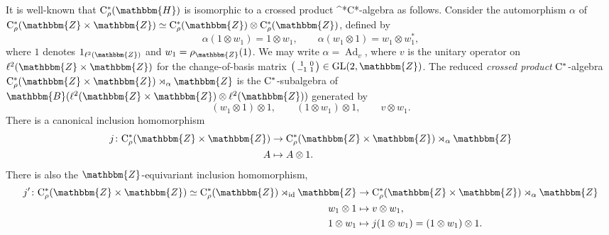 \documentclass{amsart}
\numberwithin{figure}{section}
\numberwithin{equation}{section}
\numberwithin{table}{section}
\theoremstyle{plain}
\theoremstyle{definition}
\theoremstyle{remark}
\theoremstyle{nonumber}
\newcommand{\Z}{\mathbb{Z}}
\newcommand{\Bdd}{\mathbb{B}}
\newcommand{\HH}{\mathbb{H}} %
\newcommand{\Cst}{\relax\ifmmode\mathrm{C}^*\else\textup{C*}\fi}
\newcommand{\Cstr}{\Cst_\rho} %
\newcommand{\GL}{\mathrm{GL}}
\newcommand{\Ad}{\operatorname{Ad}} %
\renewcommand{\mathbb}{\mathbbm} %
\begin{document}
It is well-known that
$\Cstr(\HH)$ is isomorphic to
a crossed product \Cst-algebra as follows. 
Consider the automorphism $\alpha$
of $\Cstr(\Z\times \Z)\simeq \Cstr(\Z)\otimes\Cstr(\Z)$,
defined by
\[
\alpha(1\otimes w_1)=1\otimes w_1,\qquad \alpha(w_1\otimes 1)= w_1\otimes w_1^*,
\]
where $1$ denotes $1_{\ell^2(\Z)}$ and $w_1=\rho_\Z(1)$. 
We may write $\alpha=\Ad_{v}$, 
where $v$ is the unitary operator on $\ell^2(\Z\times\Z)$ for the
change-of-basis matrix $\left(\begin{smallmatrix} 1 & 0 \\ -1 & 1
\end{smallmatrix}\right)\in\GL(2,\Z)$. 
The reduced \emph{crossed product} $\Cst$-algebra $\Cstr(\Z\times \Z)\rtimes_{\alpha}\Z$ is the $\Cst$-subalgebra of $\Bdd(\ell^2(\Z\times\Z)\otimes\ell^2(\Z))$ generated by
\[
(w_1\otimes 1)\otimes 1,\qquad (1\otimes w_1)\otimes 1,\qquad v\otimes w_1.
\]
There is a canonical inclusion homomorphism
\begin{equation}\label{eq:inclusion.into.crossed.product}
\begin{aligned}
j\colon \Cstr(\Z\times\Z) &\to \Cstr(\Z\times\Z)\rtimes_{\alpha}\Z\\
A & \mapsto A\otimes 1.
\end{aligned}
\end{equation}
There is also the $\Z$-equivariant inclusion homomorphism,
\begin{equation}\label{eq:jprime.M.inclusion}
\begin{aligned}
j^\prime\colon \Cstr(\Z\times \Z)\simeq \Cstr(\Z)\rtimes_{\rm id}\Z &\to \Cstr(\Z\times \Z)\rtimes_{\alpha} \Z\\
w_1\otimes 1 &\mapsto v\otimes w_1,\\
1\otimes w_1 &\mapsto j(1\otimes w_1)=(1\otimes w_1)\otimes 1.
\end{aligned}
\end{equation}
\end{document}
